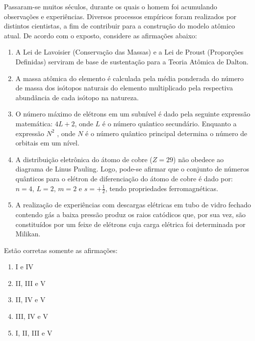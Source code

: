 Passaram-se muitos séculos, durante os quais o homem foi acumulando observações e experiências.
Diversos processos empíricos foram realizados por distintos cientistas, a fim de contribuir para a construção do modelo atômico atual.
De acordo com o exposto, considere as afirmações abaixo:

\begin{enumerate}[label = (\Roman*)]
	\item A Lei de Lavoisier (Conservação das Massas) e a Lei de Proust (Proporções Definidas) serviram de base de sustentação para a Teoria Atômica de Dalton.
	\item 	A massa atômica do elemento é calculada pela média ponderada do número de massa dos isótopos naturais do elemento multiplicado pela respectiva abundância de cada isótopo na natureza.
	\item O número máximo de elétrons em um subnível é dado pela seguinte expressão matemática:
		$4L + 2$, onde $L$ é o número quântico secundário.
		Enquanto a expressão $N^2$ , onde $N$ é o número quântico principal determina o número de orbitais em um nível.
	\item A distribuição eletrônica do átomo de cobre ($Z = 29$) não obedece ao diagrama de Linus Pauling.
		Logo, pode-se afirmar que o conjunto de números quânticos para o elétron de diferenciação do átomo de cobre é dado por:
		$n = 4$, $L= 2$, $m = 2$ e $s = +\frac{1}{2}$, tendo propriedades ferromagnéticas.
	\item A realização de experiências com descargas elétricas em tubo de vidro fechado contendo gás a baixa pressão produz os raios catódicos que, por sua vez, são constituídos por um feixe de elétrons cuja carga elétrica foi determinada por Milikan.
\end{enumerate}

Estão corretas somente as afirmações:

\begin{enumerate}[label = (\alph*), itemjoin={\qquad}]
	\item I e IV
	\item II, III e V
	\item II, IV e V
	\item III, IV e V
	\item I, II, III e V
\end{enumerate}


